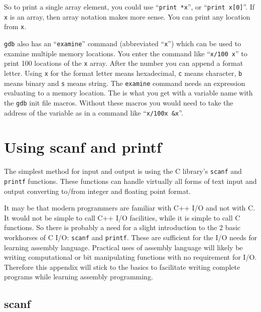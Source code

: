 \documentclass[11pt,b5paper]{book}
\begin{document}
So to print a single array element, you could use ``{\tt print *x}'', or ``{\tt print x[0]}''.
If {\tt x} is an array, then array notation makes more sense.
You can print any location from {\tt x}.

{\tt gdb} also has an ``{\tt examine}'' command (abbreviated ``{\tt x}'') which can be used to
examine multiple memory locations.
You enter the command like ``{\tt x/100 x}'' to print 100 locations of the {\tt x} array.
After the number you can append a format letter.
Using {\tt x} for the format letter means hexadecimal, {\tt c} means character, {\tt b} means
binary and {\tt s} means string.
The {\tt examine} command needs an expression evaluating to a memory location.
The is what you get with a variable name with the {\tt gdb} init file macros.
Without these macros you would need to take the address of the variable as in a
command like ``{\tt x/100x \&x}''.


\chapter{Using scanf and printf}

The simplest method for input and output is using the C library's {\tt scanf} and {\tt printf} functions. 
These functions can handle virtually all forms of text input and output converting to/from integer and
floating point format.

It may be that modern programmers are familiar with C++ I/O and not with C.
It would not be simple to call C++ I/O facilities, while it is simple to call C functions.
So there is probably a need for a slight introduction to the 2 basic workhorses of C I/O:
{\tt scanf} and {\tt printf}.
These are sufficient for the I/O needs for learning assembly language.
Practical uses of assembly language will likely be writing computational or bit manipulating functions with
no requirement for I/O.
Therefore this appendix will stick to the basics to facilitate writing complete programs while learning
assembly programming.

\section{scanf}
\end{document}
